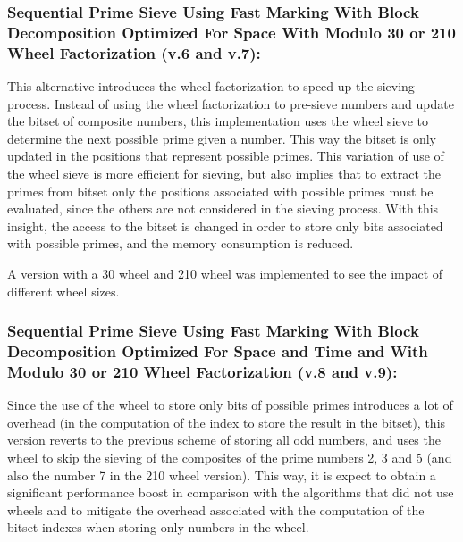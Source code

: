 \documentclass[runningheads,a4paper]{llncs}
\begin{document}
\subsubsection{Sequential Prime Sieve Using Fast Marking With Block Decomposition Optimized For Space With Modulo 30 or 210 Wheel Factorization (v.6 and v.7):}
\label{Sequential Prime Sieve Using Fast Marking With Block Decomposition Optimized For Space With Modulo 30 or 210 Wheel Factorization}

This alternative introduces the wheel factorization to speed up the sieving process. Instead of using the wheel factorization to pre-sieve numbers and update the bitset of composite numbers, this implementation uses the wheel sieve to determine the next possible prime given a number. This way the bitset is only updated in the positions that represent possible primes. This variation of use of the wheel sieve is more efficient for sieving, but also implies that to extract the primes from bitset only the positions associated with possible primes must be evaluated, since the others are not considered in the sieving process. With this insight, the access to the bitset is changed in order to store only bits associated with possible primes, and the memory consumption is reduced.

A version with a 30 wheel and 210 wheel was implemented to see the impact of different wheel sizes.


\subsubsection{Sequential Prime Sieve Using Fast Marking With Block Decomposition Optimized For Space and Time and With Modulo 30 or 210 Wheel Factorization (v.8 and v.9):}
\label{Sequential Prime Sieve Using Fast Marking With Block Decomposition Optimized For Space and Time and With Modulo 30 Wheel Factorization}

Since the use of the wheel to store only bits of possible primes introduces a lot of overhead (in the computation of the index to store the result in the bitset), this version reverts to the previous scheme of storing all odd numbers, and uses the wheel to skip the sieving of the composites of the prime numbers 2, 3 and 5 (and also the number 7 in the 210 wheel version). This way, it is expect to obtain a significant performance boost in comparison with the algorithms that did not use wheels and to mitigate the overhead associated with the computation of the bitset indexes when storing only numbers in the wheel.
\end{document}
